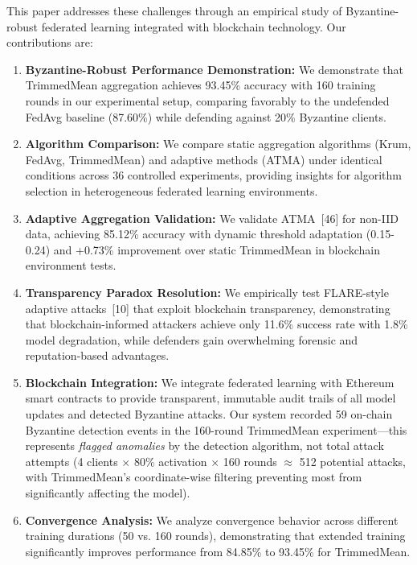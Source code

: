 \documentclass[12pt,a4paper,onecolumn]{article}
\begin{document}
This paper addresses these challenges through an empirical study of Byzantine-robust federated learning integrated with blockchain technology. Our contributions are:

\begin{enumerate}
    \item \textbf{Byzantine-Robust Performance Demonstration:} We demonstrate that TrimmedMean aggregation achieves 93.45\% accuracy with 160 training rounds in our experimental setup, comparing favorably to the undefended FedAvg baseline (87.60\%) while defending against 20\% Byzantine clients.
    
    \item \textbf{Algorithm Comparison:} We compare static aggregation algorithms (Krum, FedAvg, TrimmedMean) and adaptive methods (ATMA) under identical conditions across 36 controlled experiments, providing insights for algorithm selection in heterogeneous federated learning environments.
    
    \item \textbf{Adaptive Aggregation Validation:} We validate ATMA~[46] for non-IID data, achieving 85.12\% accuracy with dynamic threshold adaptation (0.15-0.24) and +0.73\% improvement over static TrimmedMean in blockchain environment tests.
    
    \item \textbf{Transparency Paradox Resolution:} We empirically test FLARE-style adaptive attacks~[10] that exploit blockchain transparency, demonstrating that blockchain-informed attackers achieve only 11.6\% success rate with 1.8\% model degradation, while defenders gain overwhelming forensic and reputation-based advantages.
    
    \item \textbf{Blockchain Integration:} We integrate federated learning with Ethereum smart contracts to provide transparent, immutable audit trails of all model updates and detected Byzantine attacks. Our system recorded 59 on-chain Byzantine detection events in the 160-round TrimmedMean experiment---this represents \emph{flagged anomalies} by the detection algorithm, not total attack attempts (4 clients $\times$ 80\% activation $\times$ 160 rounds $\approx$ 512 potential attacks, with TrimmedMean's coordinate-wise filtering preventing most from significantly affecting the model).
    
    \item \textbf{Convergence Analysis:} We analyze convergence behavior across different training durations (50 vs. 160 rounds), demonstrating that extended training significantly improves performance from 84.85\% to 93.45\% for TrimmedMean.
    

\end{enumerate}
\end{document}
